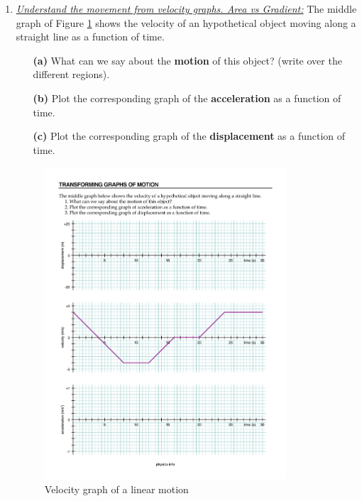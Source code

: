 \documentclass[A4,12pt]{article}
\begin{document}
\begin{enumerate}[label=\bfseries (\arabic*)]
%
%
%
%
%
%
%
%
%
%
%
%
%
%
%
%
%
%
%
%
%
%
%
%
%
%
%
\item \href{https://physics.info/motion-graphs/worksheet-transform.pdf}{\it Understand the movement from velocity graphs. Area vs Gradient:} The middle graph of Figure \ref{fig:velocity1} shows the  velocity of an hypothetical object moving along a straight line as a function of time.
\begin{itemize}
    \item[\bf (a)] What can we say about the \textbf{motion} of this object? (write over the different regions).
    \item[\bf (b)] Plot the corresponding graph of the {\bf acceleration} as a function of time.
    \item[\bf (c)] Plot the corresponding graph of the {\bf displacement} as a function of time.
\end{itemize}
\begin{figure}[h!]
    \centering
    \includegraphics[width=0.85\textwidth]{linmov1.pdf}
    \caption{Velocity graph of a linear motion}
    \label{fig:velocity1}
\end{figure}
\newpage
%
%
%
%
%
%
%
%
%
%
%
%
%
%
%
%
%
%
%
%
%
%
%
%
%
%
%
%
%
%
%
%

\end{enumerate}
\end{document}
